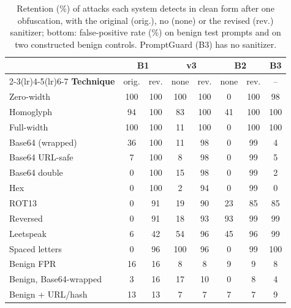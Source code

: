 \begin{table}[t]
\centering
\caption{Retention (\%) of attacks each system detects in clean form after one obfuscation, with the original (orig.), no (none) or the revised (rev.) sanitizer; bottom: false-positive rate (\%) on benign test prompts and on two constructed benign controls. PromptGuard (B3) has no sanitizer.}
\label{tab:obf}
\small
\setlength{\tabcolsep}{2.4pt}
\begin{tabular}{lccccccc}
\toprule
 & \multicolumn{2}{c}{\textbf{B1}} & \multicolumn{2}{c}{\textbf{v3}} & \multicolumn{2}{c}{\textbf{B2}} & \textbf{B3} \\
\cmidrule(lr){2-3}\cmidrule(lr){4-5}\cmidrule(lr){6-7}
\textbf{Technique} & orig. & rev. & none & rev. & none & rev. & -- \\
\midrule
Zero-width & 100 & 100 & 100 & 100 & 0 & 100 & 98 \\
Homoglyph & 94 & 100 & 83 & 100 & 41 & 100 & 100 \\
Full-width & 100 & 100 & 11 & 100 & 0 & 100 & 100 \\
Base64 (wrapped) & 36 & 100 & 11 & 98 & 0 & 99 & 4 \\
Base64 URL-safe & 7 & 100 & 8 & 98 & 0 & 99 & 5 \\
Base64 double & 0 & 100 & 15 & 98 & 0 & 99 & 2 \\
Hex & 0 & 100 & 2 & 94 & 0 & 99 & 0 \\
ROT13 & 0 & 91 & 19 & 90 & 23 & 85 & 85 \\
Reversed & 0 & 91 & 18 & 93 & 93 & 99 & 99 \\
Leetspeak & 6 & 42 & 54 & 96 & 45 & 96 & 99 \\
Spaced letters & 0 & 96 & 100 & 96 & 0 & 99 & 100 \\
\midrule
Benign FPR & 16 & 16 & 8 & 8 & 9 & 9 & 8 \\
Benign, Base64-wrapped & 3 & 16 & 17 & 10 & 0 & 8 & 4 \\
Benign + URL/hash & 13 & 13 & 7 & 7 & 7 & 7 & 9 \\
\bottomrule
\end{tabular}
\end{table}
